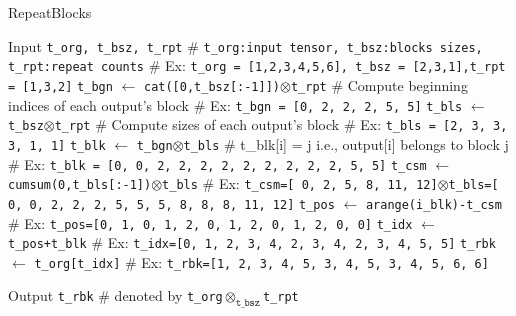 \documentclass{article}
\newcommand{\py}[1]{\texttt{#1}}
\begin{document}
\begin{algorithm}
\caption{RepeatBlocks }
\label{alg:RepeatBlocks}
\begin{algorithmic}[1]
\State Input \py{t\_org, t\_bsz, t\_rpt}
\Statex \textcolor{green!50!black}{\scriptsize \# \py{t\_org:input tensor, t\_bsz:blocks sizes, t\_rpt:repeat counts}}
\Statex \textcolor{green!50!black}{\scriptsize \# Ex: \py{t\_org = [1,2,3,4,5,6], t\_bsz = [2,3,1],t\_rpt = [1,3,2]}}
\State \py{t\_bgn} $\gets$ \py{cat([0,t\_bsz[:-1]])}$\otimes$\py{t\_rpt}
\Statex \textcolor{green!50!black}{\scriptsize \# Compute beginning indices of each output's block}
\Statex \textcolor{green!50!black}{\scriptsize \# Ex: \py{t\_bgn = [0, 2, 2, 2, 5, 5]}}
\State \py{t\_bls} $\gets$ \py{t\_bsz}$\otimes$\py{t\_rpt}
\Statex \textcolor{green!50!black}{\scriptsize \# Compute sizes of each output's block}
\Statex \textcolor{green!50!black}{\scriptsize \# Ex: \py{t\_bls = [2, 3, 3, 3, 1, 1]}}
\State \py{t\_blk} $\gets$ \py{t\_bgn}$\otimes$\py{t\_bls}
\Statex \textcolor{green!50!black}{\scriptsize \# t\_blk[i] = j i.e., output[i] belongs to block j}
\Statex \textcolor{green!50!black}{\scriptsize \# Ex: \py{t\_blk = [0, 0, 2, 2, 2, 2, 2, 2, 2, 2, 2, 5, 5]}}
\State \py{t\_csm} $\gets$ \py{cumsum(0,t\_bls[:-1])}$\otimes$\py{t\_bls}
\Statex \textcolor{green!50!black}{\scriptsize \# Ex: \py{t\_csm=[ 0,  2,  5,  8, 11, 12]$\otimes$t\_bls=[ 0,  0,  2,  2,  2,  5,  5,  5,  8,  8,  8, 11, 12]}}
\State \py{t\_pos} $\gets$ \py{arange(i\_blk)-t\_csm}
\Statex \textcolor{green!50!black}{\scriptsize \# Ex: \py{t\_pos=[0, 1, 0, 1, 2, 0, 1, 2, 0, 1, 2, 0, 0]}}
\State \py{t\_idx} $\gets$ \py{t\_pos+t\_blk}
\Statex \textcolor{green!50!black}{\scriptsize \# Ex: \py{t\_idx=[0, 1, 2, 3, 4, 2, 3, 4, 2, 3, 4, 5, 5]}}
\State \py{t\_rbk} $\gets$ \py{t\_org[t\_idx]}
\Statex \textcolor{green!50!black}{\scriptsize \# Ex: \py{t\_rbk=[1, 2, 3, 4, 5, 3, 4, 5, 3, 4, 5, 6, 6]}}

\State Output \py{t\_rbk} 
\Statex \textcolor{green!50!black}{\scriptsize \# denoted by \py{t\_org}$\otimes_{\py{t\_bsz}}$\py{t\_rpt}}
\end{algorithmic}
\end{algorithm}
\end{document}
